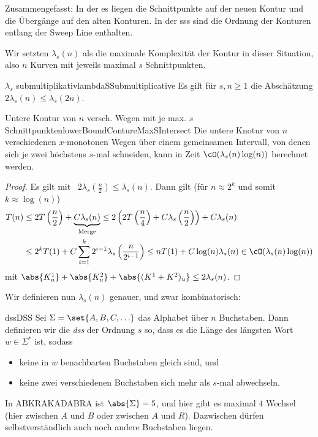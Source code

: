 \documentclass[language=ngerman,algolist,acrolist]{TemplateLecture}
\begin{document}
Zusammengefasst: In der \ac{es} liegen die Schnittpunkte auf der neuen Kontur und die Übergänge auf den alten Konturen. In der \ac{sss} sind die Ordnung der Konturen entlang der Sweep Line enthalten.


Wir setzten $\lambda_s(n)$ als die maximale Komplexität der Kontur in dieser Situation, also $n$ Kurven mit jeweils maximal $s$ Schnittpunkten.

\begin{lem}{$\lambda_s$ submultiplikativ}{lambdaSSubmultiplicative}
    Es gilt für $s, n \geq 1$ die Abschätzung $2\lambda_s(n) \leq \lambda_s(2n)$.
\end{lem}

\begin{thm}{Untere Kontur von $n$ versch. Wegen mit je max. $s$ Schnittpunkten}{lowerBoundContureMaxSIntersect}
    Die untere Knotur von $n$ verschiedenen $x$-monotonen Wegen über einem gemeinsamen Intervall, von denen sich je zwei höchstens $s$-mal schneiden, kann in Zeit $\cO(\lambda_s(n) \log(n))$ berechnet werden.
\end{thm}
\begin{proof}
    Es gilt mit~ $2\lambda_s \left( \frac{n}{2} \right) \leq \lambda_s(n)$. Dann gilt (für $n \approx 2^k$ und somit $k \approx \log(n)$)
    \begin{equation*}
        \begin{split}
            T(n) &\leq 2T\left( \frac{n}{2} \right) + \underset{\text{Merge}}{\underbrace{C \lambda_s(n)}} \leq 2\left( 2T\left( \frac{n}{4} \right) + C \lambda_s\left( \frac{n}{2} \right) \right) + C \lambda_s(n) \\
            &\leq 2^k T(1) + C \sum_{i = 1}^k 2^{i-1}\lambda_s\left( \frac{n}{2^{i-1}} \right) \leq n T(1) + C\log(n) \lambda_s(n) \in \cO(\lambda_s(n) \log(n))
        \end{split}
    \end{equation*}
    mit $\abs{K^1_u} + \abs{K^2_u} + \abs{(K^1 + K^2)_u} \leq 2 \lambda_s(n)$.
\end{proof}

Wir definieren nun $\lambda_s(n)$ genauer, und zwar kombinatorisch:

\begin{defi}{\ac{dss}}{DSS}
    Sei $\Sigma = \set{A, B, C, \ldots}$ das Alphabet über $n$ Buchstaben. Dann definieren wir die \emph{\acf{dss}} der Ordnung $s$ so, dass es die Länge des längsten Wort $w \in \Sigma^*$ ist, sodass 
    \begin{itemize}
        \item keine in $w$ benachbarten Buchstaben gleich sind, und
        \item keine zwei verschiedenen Buchstaben sich mehr als $s$-mal abwechseln.
    \end{itemize}
\end{defi}
\begin{example}
    In ABKRAKADABRA ist $\abs{\Sigma} = 5$, und hier gibt es maximal $4$ Wechsel (hier zwischen $A$ und $B$ oder zwischen $A$ und $R$). Dazwischen dürfen selbstverständlich auch noch andere Buchstaben liegen.
\end{example}
\end{document}
